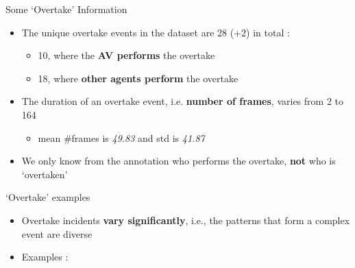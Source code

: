 \documentclass[10pt, aspectratio=169]{beamer}
\begin{document}
\begin{frame}{Some `Overtake' Information}
    \begin{itemize}
        \setlength{\itemsep}{15pt}
        \item  The unique overtake events in the dataset are \textcolor{umBlueLighter}{28 (+2)} in total :
        \vspace{4pt}
        \begin{itemize}
            \setlength{\itemsep}{3pt}
            \item \textcolor{umBlueLighter}{10}, where the \textbf{AV performs} the overtake
            \item \textcolor{umBlueLighter}{18}, where \textbf{other agents perform} the overtake
        \end{itemize}
        \item The duration of an overtake event, i.e. \textbf{number of frames}, varies from \textcolor{umBlueLighter}{2 to 164}
        \vspace{4pt}
        \begin{itemize}
            \item mean \#frames is \textit{49.83} and std is \textit{41.87}
        \end{itemize}
        \item We only know from the annotation who performs the overtake, \textbf{not} who is `overtaken'
    \end{itemize}
\end{frame}

\begin{frame}{`Overtake' examples}
    \begin{itemize}
        \setlength{\itemsep}{14pt}
        \item  Overtake incidents \textbf{vary significantly}, i.e., the patterns that form a complex event are diverse
        \item \textcolor{umBlueLighter}{Examples :}
    \end{itemize}
\end{frame}
\end{document}
